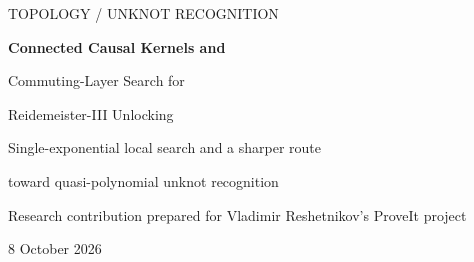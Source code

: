 \documentclass[11pt]{article}
\theoremstyle{definition}
\newcommand{\poly}{\operatorname{poly}}
\begin{document}
\begin{titlepage}
\vspace*{0.15in}
{\large\sffamily\color{inkblue} TOPOLOGY / UNKNOT RECOGNITION\par}
\vspace{0.25in}
{\LARGE\bfseries Connected Causal Kernels and\par
Commuting-Layer Search for\par
Reidemeister-III Unlocking\par}
\vspace{0.3in}
{\large Single-exponential local search and a sharper route\par
toward quasi-polynomial unknot recognition\par}
\vspace{0.25in}
{\large Research contribution prepared for Vladimir Reshetnikov's ProveIt project\par}
\vspace{0.15in}
{8 October 2026\par}
\vspace{0.2in}
\begin{abstract}
We study the exact local subproblem of deciding whether at most $k$
Reidemeister-III moves can expose a crossing-decreasing Reidemeister-I or
Reidemeister-II move in an $N$-crossing classical knot diagram. The inspected
ProveIt implementation bounds a related support-aware search by
$N^{b+O(1)}(Ck)^k$, where $b$ is the number of independent births.
We first replace chronological interleavings by commuting layers and obtain
$N^{b+O(1)}2^{O(k)}$. A state-dependent version of the usual heap construction
admits an injective encoding by bounded-slot forests; the exact forest count is
$\frac{b}{j}\binom{dj}{j-b}$.

A second argument removes the birth parameter for the unlocking problem.
The backwards causal cone of one terminal reduction has a set of at most
$3k+2$ core crossings connected in the \emph{initial} projection graph,
even though the intervening moves change that graph. Full read/write
footprints are retained. Enumerating these connected cores and applying
the layer search gives a deterministic
$\poly(N,k)2^{O(k)}$ algorithm, with polynomial workspace, for every bounded
unlocking instance. A deliberately loose explicit bound is
$\poly(N,k)2^{23k+11}$.


\end{abstract}
\end{titlepage}
\end{document}
